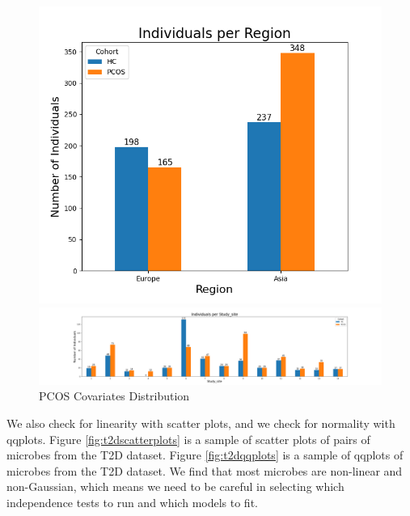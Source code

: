 \documentclass[12pt,letterpaper]{article}
\begin{document}
\begin{figure}[h!]
\begin{minipage}{0.2\linewidth}
  \centering
  \includegraphics[width=\linewidth]{../plots/pcos/region_bar_chart.png}
\end{minipage}%
\begin{minipage}{0.8\linewidth}
   \centering
   \includegraphics[width=\linewidth]{../plots/pcos/study_site_bar_chart.png}
\end{minipage}
\caption{PCOS Covariates Distribution}
\label{fig:pcoscovariates}
\end{figure}

We also check for linearity with scatter plots, and we check for normality with qqplots. Figure \ref{fig:t2dscatterplots} is a sample of scatter plots of pairs of microbes from the T2D dataset. Figure \ref{fig:t2dqqplots} is a sample of qqplots of microbes from the T2D dataset. We find that most microbes are non-linear and non-Gaussian, which means we need to be careful in selecting which independence tests to run and which models to fit. 
\end{document}
